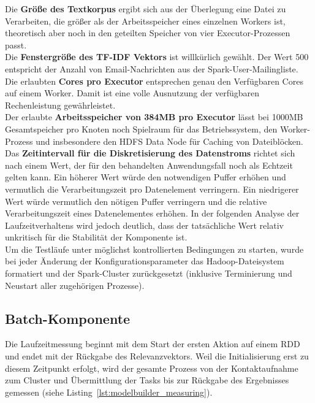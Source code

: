 Die \textbf{Größe des Textkorpus} ergibt sich aus der Überlegung eine Datei zu Verarbeiten, die größer als der Arbeitsspeicher eines einzelnen Workers ist, theoretisch aber noch in den geteilten Speicher von vier Executor-Prozessen passt.\\

Die \textbf{Fenstergröße des TF-IDF Vektors} ist willkürlich gewählt. Der Wert 500 entspricht der Anzahl von Email-Nachrichten aus der Spark-User-Mailingliste.\\

Die erlaubten \textbf{Cores pro Executor} entsprechen genau den Verfügbaren Cores auf einem Worker. Damit ist eine volle Ausnutzung der verfügbaren Rechenleistung gewährleistet.\\

Der erlaubte \textbf{Arbeitsspeicher von 384MB pro Executor} lässt bei 1000MB Gesamtspeicher pro Knoten noch Spielraum für das Betriebssystem, den Worker-Prozess und insbesondere den HDFS Data Node für Caching von Dateiblöcken.\\

Das \textbf{Zeitintervall für die Diskretisierung des Datenstroms} richtet sich nach einem Wert, der für den behandelten Anwendungsfall noch als Echtzeit gelten kann.
Ein höherer Wert würde den notwendigen Puffer erhöhen und vermutlich die Verarbeitungszeit pro Datenelement verringern. Ein niedrigerer Wert würde vermutlich den nötigen Puffer verringern und die relative Verarbeitungszeit eines Datenelementes erhöhen. In der folgenden Analyse der Laufzeitverhaltens wird jedoch deutlich, dass der tatsächliche Wert relativ unkritisch für die Stabilität der Komponente ist.\\

Um die Testläufe unter möglichst kontrollierten Bedingungen zu starten, wurde bei jeder Änderung der Konfigurationsparameter das Hadoop-Dateisystem formatiert und der Spark-Cluster zurückgesetzt (inklusive Terminierung und Neustart aller zugehörigen Prozesse).

\subsection{Batch-Komponente}

Die Laufzeitmessung beginnt mit dem Start der ersten Aktion auf einem \gls{RDD} und endet mit der Rückgabe des Relevanzvektors.
Weil die Initialisierung erst zu diesem Zeitpunkt erfolgt, wird der gesamte Prozess von der Kontaktaufnahme zum Cluster und Übermittlung der Tasks bis zur Rückgabe des Ergebnisses gemessen (siehe Listing~\ref{lst:modelbuilder_measuring}).\\

